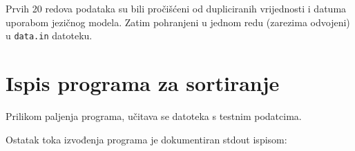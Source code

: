 \documentclass[12pt,a4paper]{report}
\begin{document}
Prvih 20 redova podataka su bili pročišćeni od dupliciranih vrijednosti
i datuma uporabom jezičnog modela. Zatim pohranjeni u jednom redu
(zarezima odvojeni) u \verb|data.in| datoteku.

\chapter{Ispis programa za sortiranje}

Prilikom paljenja programa, učitava se datoteka s testnim podatcima.

Ostatak toka izvođenja programa je dokumentiran stdout ispisom:

\inputminted[breaklines]{text}{output.txt}
\end{document}
